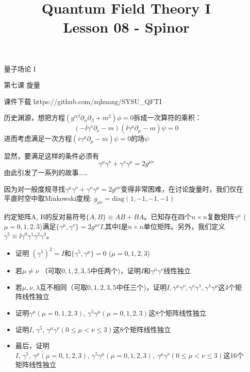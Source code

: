 \documentclass[CJK]{beamer}
\title{Quantum Field Theory I \\ Lesson 08 - Spinor}
\author{}
\date{}
\begin{document}
\begin{frame}
 
\begin{center}
\begin{Large}
\bch
量子场论 I 

{\vskip 0.3in}

第七课 旋量

\ech
\end{Large}
\end{center}

\vskip 0.2in

\bch
课件下载
\ech
https://github.com/zqhuang/SYSU\_QFTI

\end{frame}


\begin{frame}
\bch
历史渊源，想把方程$(g^{\alpha\beta}\partial_\alpha\partial_\beta + m^2)\phi = 0$拆成一次算符的乘积：
$$(-\ii\gamma^\nu\partial_\nu - m)(\ii \gamma^\mu\partial_\mu - m)\psi = 0$$
进而考虑满足一次方程$(i\gamma^\mu\partial_\mu - m)\psi = 0$的场$\psi$

\skipline
显然，要满足这样的条件必须有
$$\gamma^\mu\gamma^\nu + \gamma^\nu\gamma^\mu = 2g^{\mu\nu}$$
由此引发了一系列的故事……
\ech
\end{frame}


\begin{frame}
\bch
因为对一般度规寻找$\gamma^\mu\gamma^\nu + \gamma^\nu\gamma^\mu = 2g^{\mu\nu}$变得非常困难，在讨论旋量时，我们仅在平直时空中取Minkowski度规:
$g_{\mu\nu} = \mathrm{diag}(1, -1, -1, -1)$
\ech

\end{frame}

\begin{frame}
\bch

约定矩阵A, B的反对易符号$\{A, B\}\equiv AB + BA$。已知存在四个$n\times n$复数矩阵$\gamma^\mu$ ($\mu = 0, 1, 2, 3$)满足$\{\gamma^\mu,\gamma^\nu\} = 2g^{\mu\nu}I$,其中I是$n\times n $单位矩阵。另外，我们定义$\gamma^5\equiv \ii\gamma^0\gamma^1\gamma^2\gamma^3$。
\begin{itemize}
\item{证明 $(\gamma^5)^2 = I$和$\{\gamma^5,\gamma^\mu\} = 0$ ($\mu = 0,1,2,3$)}
\item{若$\mu\ne \nu$ （可取$0,1,2,3,5$中任两个)，证明$I$和$\gamma^\mu\gamma^\nu$线性独立}
\item{若$\mu,\nu,\lambda$互不相同（可取$0,1,2,3,5$中任三个)，证明$I,\gamma^\mu\gamma^\nu,\gamma^\nu\gamma^\lambda,\gamma^\lambda\gamma^\mu$这4个矩阵线性独立}
\item{证明$\gamma^\mu (\mu = 0,1,2,3),\, \gamma^5\gamma^\mu (\mu = 0,1,2,3)$这8个矩阵线性独立}
\item{证明$I,\, \gamma^5,\,  \gamma^\mu\gamma^\nu (0\le \mu<\nu\le 3)$这8个矩阵线性独立}
\item{最后，证明 $I,\, \gamma^5,\, \gamma^\mu(\mu=0,1,2,3),\, \gamma^5\gamma^\mu(\mu=0,1,2,3),\ \gamma^\mu\gamma^\nu (0\le \mu<\nu\le 3)$这16个矩阵线性独立}
\end{itemize}

\ech
\end{frame}
\end{document}
